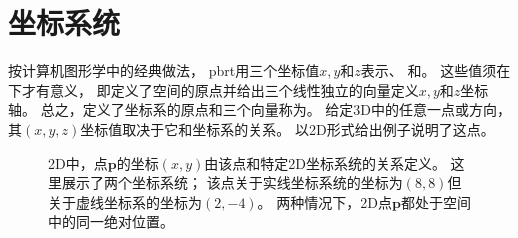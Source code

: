\section{坐标系统}\label{sec:坐标系统}

按计算机图形学中的经典做法，
pbrt用三个坐标值$x,y$和$z$表示、
和。
这些值须在下才有意义，
即定义了空间的原点并给出三个线性独立的向量定义$x,y$和$z$坐标轴。
总之，定义了坐标系的原点和三个向量称为。
给定3D中的任意一点或方向，其$(x,y,z)$坐标值取决于它和坐标系的关系。
以2D形式给出例子说明了这点。
\begin{figure}
    
    \caption{2D中，点$\bm p$的坐标$(x,y)$由该点和特定2D坐标系统的关系定义。
        这里展示了两个坐标系统；
        该点关于实线坐标系统的坐标为$(8,8)$但
        关于虚线坐标系的坐标为$(2,-4)$。
        两种情况下，2D点$\bm p$都处于空间中的同一绝对位置。}
    \label{fig:2.1}
\end{figure}